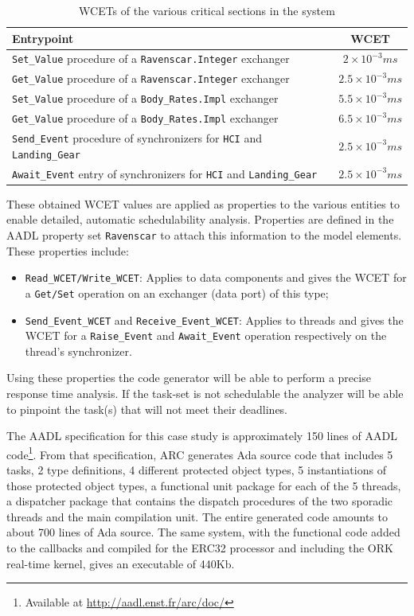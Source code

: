 \begin{table}
\centering
\begin{tabular}{|l|c|}
\hline
\textbf{Entrypoint} & \textbf{WCET}\\
\hline
\texttt{Set\_Value} procedure of a \texttt{Ravenscar.Integer}
exchanger & $2\times 10^{-3} ms$\\
\texttt{Get\_Value} procedure of a \texttt{Ravenscar.Integer}
exchanger & $2.5\times 10^{-3} ms$\\
\texttt{Set\_Value} procedure of a \texttt{Body\_Rates.Impl} exchanger
& $5.5\times 10^{-3} ms$\\
\texttt{Get\_Value} procedure of a \texttt{Body\_Rates.Impl} exchanger
& $6.5\times 10^{-3} ms$\\
\texttt{Send\_Event} procedure of synchronizers for \texttt{HCI} and
\texttt{Landing\_Gear} & $2.5\times 10^{-3} ms$\\
\texttt{Await\_Event} entry of synchronizers for \texttt{HCI} and
\texttt{Landing\_Gear} & $2.5\times 10^{-3} ms$\\
\hline
\end{tabular}
\caption{WCETs of the various critical sections in the system}
\label{tab:wcets}
\end{table}

These obtained WCET values are applied as properties to the various
\aadl entities to enable detailed, automatic schedulability
analysis. Properties are defined in the AADL property set
\texttt{Ravenscar} to attach this information to the model elements.
These properties include:

\begin{itemize}
\item{\texttt{Read\_WCET/Write\_WCET}: Applies to data components and
  gives the WCET for a \texttt{Get/Set} operation on an exchanger
  (data port) of this type;}
\item{\texttt{Send\_Event\_WCET} and \texttt{Receive\_Event\_WCET}:
  Applies to threads and gives the WCET for a \texttt{Raise\_Event}
  and \texttt{Await\_Event} operation respectively on the thread's
  synchronizer.}
\end{itemize}

Using these properties the code generator will be able to perform a
precise response time analysis. If the task-set is not schedulable the
analyzer will be able to pinpoint the task(s) that will not meet their
deadlines.

The AADL specification for this case study is approximately 150 lines
of AADL code\footnote{Available at
  \url{http://aadl.enst.fr/arc/doc/}}. From that specification, ARC
generates Ada source code that includes 5 tasks, 2 type definitions, 4
different protected object types, 5 instantiations of those protected
object types, a functional unit package for each of the 5 threads, a
dispatcher package that contains the dispatch procedures of the two
sporadic threads and the main compilation unit. The entire generated
code amounts to about 700 lines of Ada source. The same system, with
the functional code added to the callbacks and compiled for the ERC32
processor and including the ORK real-time kernel, gives an executable
of 440Kb.

